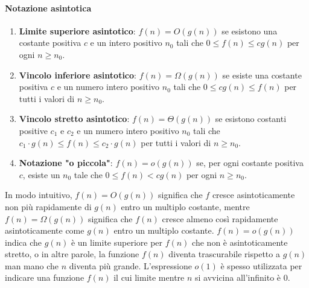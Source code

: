 \documentclass{article}
\theoremstyle{definition}
\begin{document}
\paragraph{Notazione asintotica}
\begin{enumerate}
\item \textbf{Limite superiore asintotico}: \( f(n) = O(g(n)) \) se esistono una costante positiva \( c \) e un intero positivo \( n_0 \) tali che \( 0 \leq f(n) \leq cg(n) \) per ogni \( n \geq n_0 \).


\item \textbf{Vincolo inferiore asintotico}: \( f(n) = \Omega(g(n)) \) se esiste una costante positiva \( c \) e un numero intero positivo \( n_0 \) tali che \( 0 \leq c  g(n) \leq f(n) \) per tutti i valori di \( n \geq n_0 \).

\item \textbf{Vincolo stretto asintotico}: \( f(n) = \Theta(g(n)) \) se esistono costanti positive \( c_1 \) e \( c_2 \) e un numero intero positivo \( n_0 \) tali che \( c_1 \cdot g(n) \leq f(n) \leq c_2 \cdot g(n) \) per tutti i valori di \( n \geq n_0 \).

\item \textbf{Notazione "o piccola"}: \( f(n) = o(g(n)) \) se, per ogni costante positiva \( c \), esiste un \( n_0 \) tale che \( 0 \leq f(n) < c  g(n) \) per ogni \( n \geq n_0 \).

\end{enumerate}

In modo intuitivo, \(f(n) = O(g(n))\) significa che \(f\) cresce asintoticamente non più rapidamente di \(g(n)\) entro un multiplo costante, mentre \(f(n) = \Omega(g(n))\) significa che \(f(n)\) cresce almeno così rapidamente asintoticamente come \(g(n)\) entro un multiplo costante. \(f(n) = o(g(n))\) indica che \(g(n)\) è un limite superiore per \(f(n)\) che non è asintoticamente stretto, o in altre parole, la funzione \(f(n)\) diventa trascurabile rispetto a \(g(n)\) man mano che \(n\) diventa più grande. L'espressione \(o(1)\) è spesso utilizzata per indicare una funzione \(f(n)\) il cui limite mentre \(n\) si avvicina all'infinito è \(0\).
\end{document}
